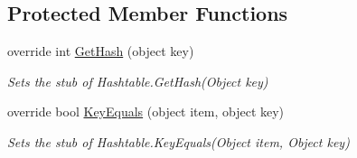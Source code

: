 \subsection*{Protected Member Functions}
\begin{DoxyCompactItemize}
\item 
override int \hyperlink{class_system_1_1_configuration_1_1_fakes_1_1_stub_settings_attribute_dictionary_a7ba8f90afb2b1af7de3ad15089c20042}{Get\-Hash} (object key)
\begin{DoxyCompactList}\small\item\em Sets the stub of Hashtable.\-Get\-Hash(\-Object key)\end{DoxyCompactList}\item 
override bool \hyperlink{class_system_1_1_configuration_1_1_fakes_1_1_stub_settings_attribute_dictionary_a8367d26dbc29e847a39ebe15b4384b8c}{Key\-Equals} (object item, object key)
\begin{DoxyCompactList}\small\item\em Sets the stub of Hashtable.\-Key\-Equals(\-Object item, Object key)\end{DoxyCompactList}\end{DoxyCompactItemize}
